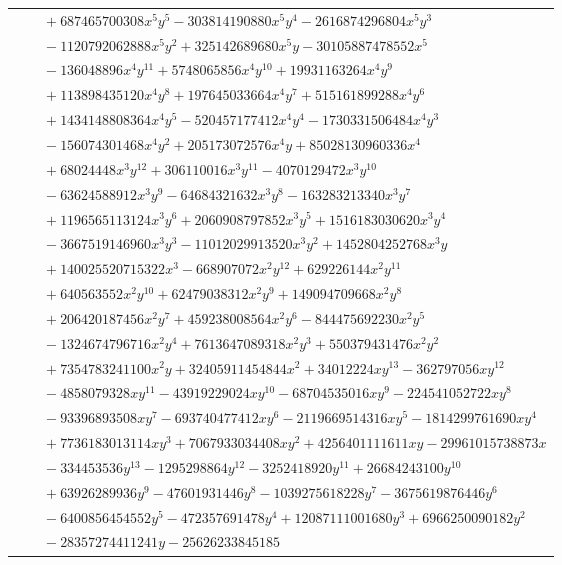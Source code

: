 \documentclass[11pt]{article}
\begin{document}
\begin{longtable}{@{}ll@{}}
 & $\quad +687465700308x^{5}y^{5}-303814190880x^{5}y^{4}-2616874296804x^{5}y^{3}$\\
 & $\quad -1120792062888x^{5}y^{2}+325142689680x^{5}y-30105887478552x^{5}$\\
 & $\quad -136048896x^{4}y^{11}+5748065856x^{4}y^{10}+19931163264x^{4}y^{9}$\\
 & $\quad +113898435120x^{4}y^{8}+197645033664x^{4}y^{7}+515161899288x^{4}y^{6}$\\
 & $\quad +1434148808364x^{4}y^{5}-520457177412x^{4}y^{4}-1730331506484x^{4}y^{3}$\\
 & $\quad -156074301468x^{4}y^{2}+205173072576x^{4}y+85028130960336x^{4}$\\
 & $\quad +68024448x^{3}y^{12}+306110016x^{3}y^{11}-4070129472x^{3}y^{10}$\\
 & $\quad -63624588912x^{3}y^{9}-64684321632x^{3}y^{8}-163283213340x^{3}y^{7}$\\
 & $\quad +1196565113124x^{3}y^{6}+2060908797852x^{3}y^{5}+1516183030620x^{3}y^{4}$\\
 & $\quad -3667519146960x^{3}y^{3}-11012029913520x^{3}y^{2}+1452804252768x^{3}y$\\
 & $\quad +140025520715322x^{3}-668907072x^{2}y^{12}+629226144x^{2}y^{11}$\\
 & $\quad +640563552x^{2}y^{10}+62479038312x^{2}y^{9}+149094709668x^{2}y^{8}$\\
 & $\quad +206420187456x^{2}y^{7}+459238008564x^{2}y^{6}-844475692230x^{2}y^{5}$\\
 & $\quad -1324674796716x^{2}y^{4}+7613647089318x^{2}y^{3}+550379431476x^{2}y^{2}$\\
 & $\quad +7354783241100x^{2}y+32405911454844x^{2}+34012224xy^{13}-362797056xy^{12}$\\
 & $\quad -4858079328xy^{11}-43919229024xy^{10}-68704535016xy^{9}-224541052722xy^{8}$\\
 & $\quad -93396893508xy^{7}-693740477412xy^{6}-2119669514316xy^{5}-1814299761690xy^{4}$\\
 & $\quad +7736183013114xy^{3}+7067933034408xy^{2}+4256401111611xy-29961015738873x$\\
 & $\quad -334453536y^{13}-1295298864y^{12}-3252418920y^{11}+26684243100y^{10}$\\
 & $\quad +63926289936y^{9}-47601931446y^{8}-1039275618228y^{7}-3675619876446y^{6}$\\
 & $\quad -6400856454552y^{5}-472357691478y^{4}+12087111001680y^{3}+6966250090182y^{2}$\\
 & $\quad -28357274411241y-25626233845185$\\

\end{longtable}
\end{document}
